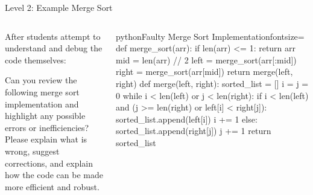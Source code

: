 \documentclass[xcolor=dvipsnames, aspectratio=169]{beamer}
\begin{document}
\begin{frame}[fragile]{Level 2: Example Merge Sort}
  \begin{columns}[T]
    \begin{column}{0.42\textwidth}
      After students attempt to understand and debug the code themselves:
      \begin{promptbox}
Can you review the following merge sort implementation and highlight any possible errors or inefficiencies? Please explain what is wrong, suggest corrections, and explain how the code can be made more efficient and robust.
      \end{promptbox}
    \end{column}
    
    \begin{column}{0.52\textwidth}
      \vspace{-1.5em}
      \begin{codeboxtc}{python}{Faulty Merge Sort Implementation}{}{fontsize=\scriptsize}
    def merge_sort(arr):
        if len(arr) <= 1:
            return arr
        mid = len(arr) // 2
        left = merge_sort(arr[:mid])
        right = merge_sort(arr[mid]) 
        return merge(left, right)
    def merge(left, right):
        sorted_list = []
        i = j = 0
        while i < len(left) or j < len(right):          
            if i < len(left) and (j >= len(right) or left[i] < right[j]):
                sorted_list.append(left[i])
                i += 1
            else:
                sorted_list.append(right[j])
                j += 1
        return sorted_list\end{codeboxtc}
    \end{column}
  \end{columns}
\end{frame}
\end{document}
